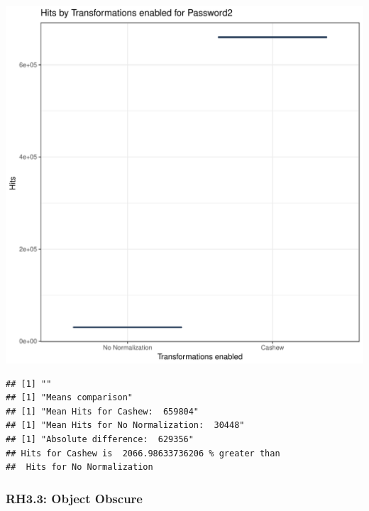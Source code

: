 \documentclass{article}\usepackage[]{graphicx}\usepackage[]{color}
\makeatletter
\def\maxwidth{ %
  \ifdim\Gin@nat@width>\linewidth
    \linewidth
  \else
    \Gin@nat@width
  \fi
}
\newenvironment{kframe}{%
 \def\at@end@of@kframe{}%
 \ifinner\ifhmode%
  \def\at@end@of@kframe{\end{minipage}}%
  \begin{minipage}{\columnwidth}%
 \fi\fi%
 \def\FrameCommand##1{\hskip\@totalleftmargin \hskip-\fboxsep
 \colorbox{shadecolor}{##1}\hskip-\fboxsep
     \hskip-\linewidth \hskip-\@totalleftmargin \hskip\columnwidth}%
 \MakeFramed {\advance\hsize-\width
   \@totalleftmargin\z@ \linewidth\hsize
   \@setminipage}}%
 {\par\unskip\endMakeFramed%
 \at@end@of@kframe}
\newenvironment{knitrout}{}{} %
\makeatother
\begin{document}
\begin{knitrout}
\color{fgcolor}
\includegraphics[width=\maxwidth]{figure/RH3_password2-1} 
\begin{kframe}

{\ttfamily\noindent\bfseries\color{errorcolor}{\#\# Error in eval(expr, envir, enclos): object 'shap\_cashew\_password2' not found}}\begin{verbatim}
## [1] ""
## [1] "Means comparison"
## [1] "Mean Hits for Cashew:  659804"
## [1] "Mean Hits for No Normalization:  30448"
## [1] "Absolute difference:  629356"
## Hits for Cashew is  2066.98633736206 % greater than 
##  Hits for No Normalization
\end{verbatim}
\end{kframe}
\end{knitrout}


\subsubsection{RH3.3: Object Obscure}
\end{document}
